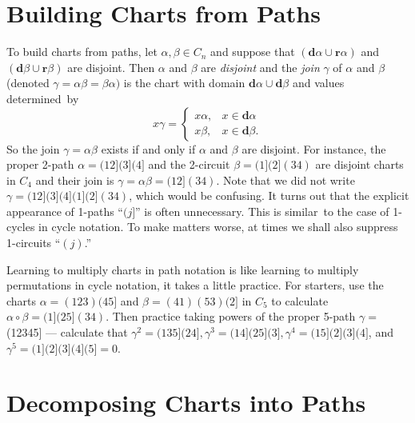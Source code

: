 \documentclass{surv-l}
\numberwithin{equation}{section}
\numberwithin{table}{section}
\numberwithin{figure}{section}
\theoremstyle{plain}
\theoremstyle{definition}
\begin{document}
\section{Building Charts from Paths}\label{sec1.2}

To build charts from paths, let $\alpha,\beta\in C_{n}$ and
suppose that $(\mathbf{d}\alpha\cup \mathbf{r}\alpha)$ and
$(\mathbf{d}\beta \cup\mathbf{r}\beta)$ are disjoint. Then
$\alpha$ and $\beta$ are \emph{disjoint} and the \emph{join}
$\gamma$ of $\alpha$ and $\beta$ (denoted
$\gamma=\alpha\beta=\beta\alpha)$ is the chart with domain
$\mathbf{d}\alpha \cup\mathbf{d}\beta$ and values determined~by
\[
x\gamma=\begin{cases}
x\alpha, & x\in \mathbf{d}\alpha\\
 x\beta, & x\in \mathbf{d}\beta.
\end{cases}
\]
So the join $\gamma=\alpha\beta$ exists if and only if $\alpha$
and $\beta$ are disjoint. For instance, the proper 2-path
$\alpha=(12](3](4]$ and the 2-circuit $\beta=(1](2](34)$ are
disjoint charts in $C_{4}$ and their join is
$\gamma=\alpha\beta=(12](34)$. Note that we did not write
$\gamma=(12](3](4](1](2](34)$, which would be confusing. It turns
out that the explicit appearance of 1-paths ``$(j]$'' is often
unnecessary. This is similar~to the case of 1-cycles in cycle
notation. To make matters worse, at times we shall also suppress
1-circuits ``$(j)$.''

Learning to multiply charts in path
notation is like learning to multiply permutations in cycle
notation, it takes a little practice. For starters, use the charts
$\alpha=(123)(45]$ and $\beta=(41)(53)(2]$ in $C_{5}$ to calculate
$\alpha \circ\beta=(1](25](34)$. Then practice taking powers of
the proper 5-path $\gamma=$ (12345] --- calculate that
$\gamma^{2}=(135](24],\gamma^{3}=(14](25](3],\gamma^{4}=(15](2](3](4]$,
and $\gamma^{5}=(1](2](3](4](5]=0$.

\section{Decomposing Charts into Paths}\label{sec1.3}
\end{document}
